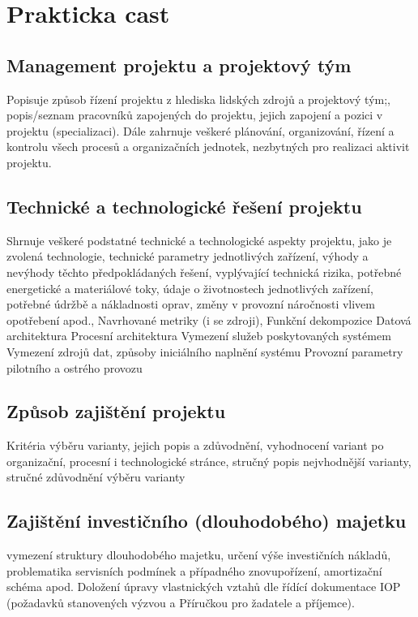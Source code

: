 \documentclass[
	12pt, oneside, printed, final, 
	table,   %
	lof,     %
	lot     %
]{fithesis3}
\begin{document}
{\chapter{Prakticka cast}

\section{Management projektu a projektový tým}

Popisuje způsob řízení projektu z hlediska lidských zdrojů a projektový tým;,
popis/seznam pracovníků zapojených do projektu, jejich zapojení a pozici v projektu
(specializaci). Dále zahrnuje veškeré plánování, organizování, řízení a kontrolu všech
procesů a organizačních jednotek, nezbytných pro realizaci aktivit projektu.

\section{Technické a technologické řešení projektu}

Shrnuje veškeré podstatné technické a technologické aspekty projektu, jako je
zvolená technologie, technické parametry jednotlivých zařízení, výhody a nevýhody
těchto předpokládaných řešení, vyplývající technická rizika, potřebné energetické a
materiálové toky, údaje o životnostech jednotlivých zařízení, potřebné údržbě a
nákladnosti oprav, změny v provozní náročnosti vlivem opotřebení apod.,
Navrhované metriky (i se zdroji),
Funkční dekompozice
Datová architektura
Procesní architektura
Vymezení služeb poskytovaných systémem
Vymezení zdrojů dat, způsoby iniciálního naplnění systému
Provozní parametry pilotního a ostrého provozu

\section{Způsob zajištění projektu}

Kritéria výběru varianty, jejich popis a zdůvodnění, vyhodnocení variant po
organizační, procesní i technologické stránce, stručný popis nejvhodnější varianty,
stručné zdůvodnění výběru varianty

\section{ Zajištění investičního (dlouhodobého) majetku}

vymezení struktury dlouhodobého majetku, určení výše investičních nákladů,
problematika servisních podmínek a případného znovupořízení, amortizační schéma
apod.
Doložení úpravy vlastnických vztahů dle řídící dokumentace IOP (požadavků
stanovených výzvou a Příručkou pro žadatele a příjemce).

}
\end{document}
